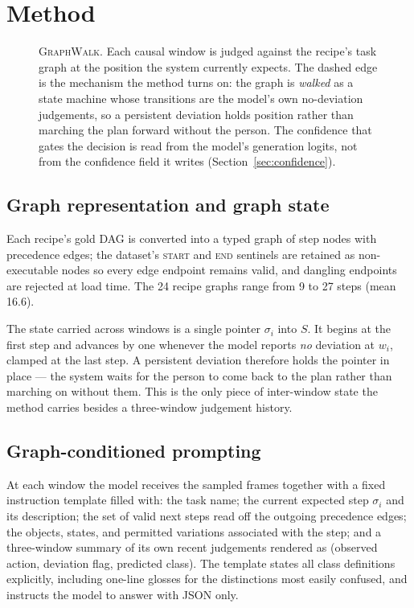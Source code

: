 \documentclass[10pt,twocolumn]{article}
\newcommand{\ourmodel}{\textsc{GraphWalk}}
\begin{document}
\section{Method}
\label{sec:method}

\begin{figure}[t]
\centering
\resizebox{0.98\textwidth}{!}{}
\caption{\ourmodel{}. Each causal window is judged against the recipe's task
graph at the position the system currently expects. The dashed edge is the
mechanism the method turns on: the graph is \emph{walked} as a state machine
whose transitions are the model's own no-deviation judgements, so a persistent
deviation holds position rather than marching the plan forward without the
person. The confidence that gates the decision is read from the model's
generation logits, not from the confidence field it writes
(Section~\ref{sec:confidence}).}
\label{fig:pipeline}
\end{figure}

\subsection{Graph representation and graph state}

Each recipe's gold DAG is converted into a typed graph of step nodes with
precedence edges; the dataset's \textsc{start} and \textsc{end} sentinels are
retained as non-executable nodes so every edge endpoint remains valid, and
dangling endpoints are rejected at load time. The 24 recipe graphs range from 9
to 27 steps (mean 16.6).

The state carried across windows is a single pointer $\sigma_i$ into $S$. It
begins at the first step and advances by one whenever the model reports
\emph{no} deviation at $w_i$, clamped at the last step. A persistent deviation
therefore holds the pointer in place --- the system waits for the person to come
back to the plan rather than marching on without them. This is the only piece of
inter-window state the method carries besides a three-window judgement history.

\subsection{Graph-conditioned prompting}

At each window the model receives the sampled frames together with a fixed
instruction template filled with: the task name; the current expected step
$\sigma_i$ and its description; the set of valid next steps read off the outgoing
precedence edges; the objects, states, and permitted variations associated with
the step; and a three-window summary of its own recent judgements rendered as
(observed action, deviation flag, predicted class). The template states all
class definitions explicitly, including one-line glosses for the distinctions
most easily confused, and instructs the model to answer with JSON only.
\end{document}
